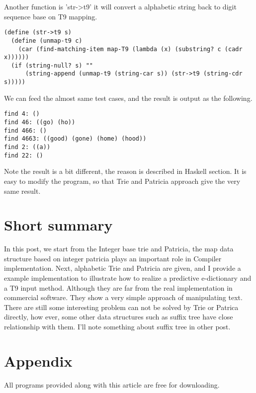 \documentclass{article}
\begin{document}
Another function is 'str->t9' it will convert a alphabetic string back
to digit sequence base on T9 mapping.

\begin{lstlisting}
(define (str->t9 s)
  (define (unmap-t9 c)
    (car (find-matching-item map-T9 (lambda (x) (substring? c (cadr x))))))
  (if (string-null? s) ""
      (string-append (unmap-t9 (string-car s)) (str->t9 (string-cdr s)))))
\end{lstlisting}

We can feed the almost same test cases, and the result is output as
the following.

\begin{verbatim}
find 4: ()
find 46: ((go) (ho))
find 466: ()
find 4663: ((good) (gone) (home) (hood))
find 2: ((a))
find 22: ()
\end{verbatim}

Note the result is a bit different, the reason is described in Haskell
section. It is easy to modify the program, so that Trie and Patricia
approach give the very same result.

\section{Short summary}

In this post, we start from the Integer base trie and Patricia, the
map data structure based on integer patricia plays an important role
in Compiler implementation. Next, alphabetic Trie and Patricia are
given, and I provide a example implementation to illustrate how to
realize a predictive e-dictionary and a T9 input method. Although they
are far from the real implementation in commercial software. They show
a very simple approach of manipulating text. There are still some
interesting problem can not be solved by Trie or Patrica directly, how
ever, some other data structures such as suffix tree have close
relationship with them. I'll note something about suffix tree in other post.

\section{Appendix} \label{appendix}
All programs provided along with this article are free for
downloading.
\end{document}
